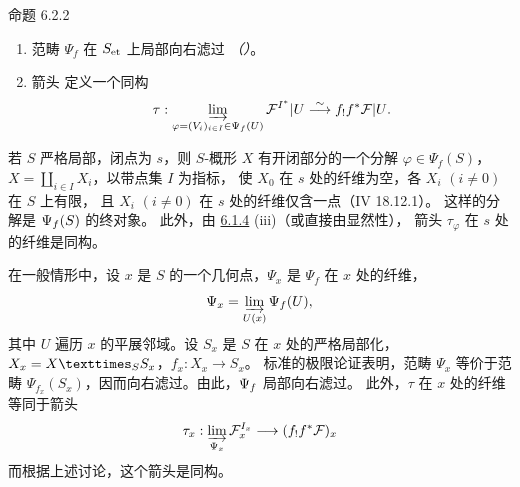 \begin{enonce*}{命题 6.2.2}
\begin{enumerate}
\renewcommand{\theenumi}{\roman{enumi}}
\renewcommand{\labelenumi}{(\theenumi)}
\item 范畴 $\Psi_{f}$ 在 $S_{\text{\rm et}}$ 上局部向右滤过
\emph{（）}。

\item 箭头  定义一个同构
\[
\tau:\varinjlim_{\varphi=(V_{i})_{i\in I}\in
\Psi_{f}(U)}{\mathcal F} ^{I^{\ast}}|U\overset{\sim}{\longrightarrow}  f_{!}f^{\ast}{\mathcal F}|U {}.
\]
\end{enumerate}
\end{enonce*}

若 $S$ 严格局部，闭点为 $s$，则 $S$-概形 $X$ 有开闭部分的一个分解
$\varphi\in\Psi_{f}(S)$，$X=\coprod_{i\in I}X_{i}$，以带点集 $I$ 为指标，
使 $X_{0}$ 在 $s$ 处的纤维为空，各 $X_{i}$ $(i\neq 0)$ 在 $S$ 上有限，
且 $X_{i}$ $(i\neq 0)$ 在 $s$ 处的纤维仅含一点（\EGA IV 18.12.1）。
这样的分解是 $\Psi_f(S)$ 的终对象。
此外，由 \hyperref[XVII.prop6.1.4]{6.1.4} (iii)（或直接由显然性），
箭头 $\tau_{\varphi}$  在 $s$ 处的纤维是同构。

在一般情形中，设 $x$ 是 $S$ 的一个几何点，$\Psi_{x}$ 是 $\Psi_{f}$ 在 $x$ 处的纤维，
\[
\Psi_{x}=\varinjlim_{U(x)} \Psi_{f}(U){},
\]
其中 $U$ 遍历 $x$ 的平展邻域。设 $S_{x}$ 是 $S$ 在 $x$ 处的严格局部化，
$X_{x}=\fprod{X}{S_{x}}{S}$，$f_{x}:X_{x}\rightarrow S_{x}$。
标准的极限论证表明\pageoriginale，范畴 $\Psi_{x}$ 等价于范畴
$\Psi_{f_{x}}(S_{x})$，因而向右滤过。由此，$\Psi_f$ 局部向右滤过。
此外，$\tau$ 在 $x$ 处的纤维等同于箭头
$$
\tau_{x}:\varinjlim_{\Psi_{x}}{\mathcal F} _{x}^{I_{x}}\longrightarrow
(f_{!}f^{\ast}{\mathcal F} )_{x}
$$
而根据上述讨论，这个箭头是同构。

